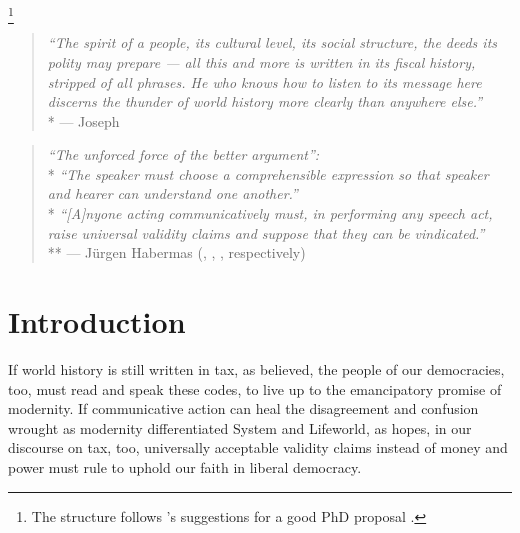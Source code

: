 
\footnote{
	The structure follows \citeauthor{Schmitter2002}'s suggestions for a good PhD proposal \citeyearpar{Schmitter2002}.
}

\begin{quote}
    \emph{``The spirit of a people, its cultural level, its social structure, the deeds its polity may prepare --- all this and more is written in its fiscal history, stripped of all phrases.
    He who knows how to listen to its message here discerns the thunder of world history more clearly than anywhere else.''}
    \\*
    --- Joseph \citet[6]{Schumpeter}
\end{quote}

\begin{quote}
    \emph{``The unforced force of the better argument'':}
	\\*
    \emph{``The speaker must choose a comprehensible expression so that speaker and hearer can understand one another.''}
    \\*
    \emph{``[A]nyone acting communicatively must, in performing any speech act, raise universal validity claims and suppose that they can be vindicated.''}
	\\**
    --- Jürgen Habermas (\citeyear[305]{Habermas1996}, \citeyear[2f]{Habermas1976}, \citeyear[2]{Habermas1979}, respectively)
\end{quote}



\section{Introduction}
If world history is still written in tax, as \citeauthor{Schumpeter} believed, the people of our democracies, too, must read and speak these codes, to live up to the emancipatory promise of modernity.
If communicative action can heal the disagreement and confusion wrought as modernity differentiated System and Lifeworld, as \citeauthor{Habermas-1984} hopes, in our discourse on tax, too, universally acceptable validity claims instead of money and power must rule to uphold our faith in liberal democracy.


